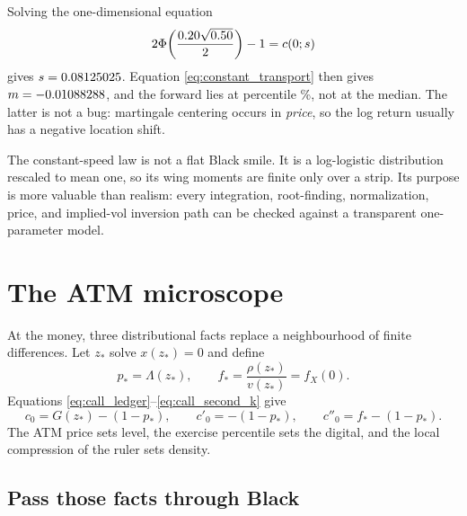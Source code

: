 \documentclass[11pt]{article}
\begin{document}
\begin{example}[title={An exact 20\% ATM unit check}]
\label{ex:constant_unit}
Solving the one-dimensional equation
\[
2\Phi\!\left(\frac{0.20\sqrt{0.50}}{2}\right)-1
=c(0;s)
\]
gives $s=0.08125025$.  Equation
\eqref{eq:constant_transport} then gives
$m=-0.01088288$, and the forward lies at percentile
\lqdfreshtoyuatmpct\%, not at the median.  The latter is not a bug:
martingale centering occurs in \emph{price}, so the log return usually has a
negative location shift.
\begin{center}
\lqdfreshtoytable
\end{center}
\end{example}



The constant-speed law is not a flat Black smile.  It is a log-logistic
distribution rescaled to mean one, so its wing moments are finite only over a
strip.  Its purpose is more valuable than realism: every integration,
root-finding, normalization, price, and implied-vol inversion path can be
checked against a transparent one-parameter model.

\section{The ATM microscope}
\label{sec:atm}

At the money, three distributional facts replace a neighbourhood of finite
differences.  Let $z_*$ solve $x(z_*)=0$ and define
\begin{equation}
p_*=\Lambda(z_*),\qquad
f_*=\frac{\rho(z_*)}{v(z_*)}=f_X(0).
\label{eq:atm_percentile_density}
\end{equation}
Equations \eqref{eq:call_ledger}--\eqref{eq:call_second_k} give
\begin{equation}
c_0=G(z_*)-(1-p_*),\qquad
c'_0=-(1-p_*),\qquad
c''_0=f_*-(1-p_*).
\label{eq:atm_three_facts}
\end{equation}
The ATM price sets level, the exercise percentile sets the digital, and the
local compression of the ruler sets density.

\subsection{Pass those facts through Black}
\end{document}
